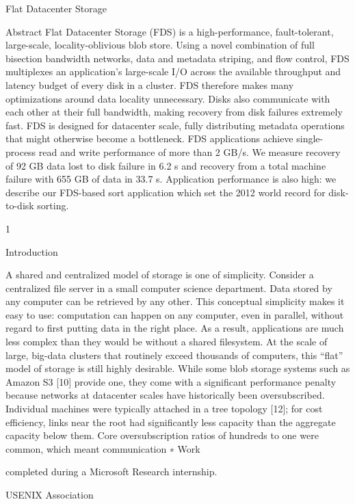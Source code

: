 Flat Datacenter Storage

Abstract
Flat Datacenter Storage (FDS) is a high-performance, fault-tolerant,
large-scale, locality-oblivious blob store.
Using a novel combination of full bisection bandwidth networks, data and
metadata striping, and flow control, FDS multiplexes an application’s
large-scale I/O across the available throughput and latency budget of every disk
in a cluster. 
FDS therefore makes many optimizations around data locality unnecessary. Disks
also communicate with each other at their full bandwidth, making recovery from disk failures extremely fast. FDS is designed for datacenter scale, fully distributing metadata
operations that might otherwise become a bottleneck.
FDS applications achieve single-process read and
write performance of more than 2 GB/s. We measure recovery of 92 GB data lost to disk failure in 6.2 s and recovery from a total machine failure with 655 GB of data
in 33.7 s. Application performance is also high: we describe our FDS-based sort application which set the 2012
world record for disk-to-disk sorting.

1

Introduction

A shared and centralized model of storage is one of
simplicity. Consider a centralized file server in a small
computer science department. Data stored by any computer can be retrieved by any other. This conceptual
simplicity makes it easy to use: computation can happen on any computer, even in parallel, without regard to
first putting data in the right place. As a result, applications are much less complex than they would be without
a shared filesystem.
At the scale of large, big-data clusters that routinely
exceed thousands of computers, this “flat” model of storage is still highly desirable. While some blob storage systems such as Amazon S3 [10] provide one, they
come with a significant performance penalty because
networks at datacenter scales have historically been oversubscribed. Individual machines were typically attached
in a tree topology [12]; for cost efficiency, links near the
root had significantly less capacity than the aggregate capacity below them. Core oversubscription ratios of hundreds to one were common, which meant communication
∗ Work

completed during a Microsoft Research internship.

USENIX Association  

